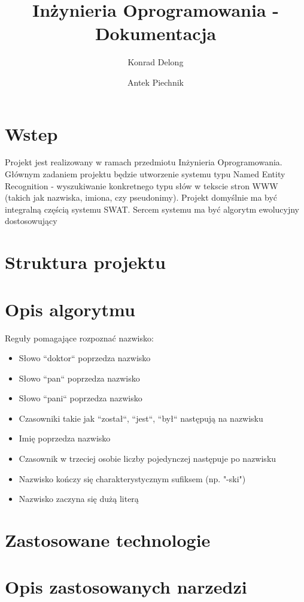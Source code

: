 \documentclass[12pt]{article}
\author{Konrad Delong \and Antek Piechnik}
\title{Inżynieria Oprogramowania - Dokumentacja}
\begin{document}
\maketitle
\tableofcontents
\newpage

\section{Wstep}
Projekt jest realizowany w ramach przedmiotu Inżynieria Oprogramowania. Głównym zadaniem projektu będzie utworzenie systemu typu Named Entity Recognition - wyszukiwanie konkretnego typu słów w tekscie stron WWW (takich jak nazwiska, imiona, czy pseudonimy). Projekt domyślnie ma być integralną częścią systemu SWAT. Sercem systemu ma być algorytm ewolucyjny dostosowujący 
\section{Struktura projektu}
\section{Opis algorytmu}
Reguły pomagające rozpoznać nazwisko:
\begin{itemize}
\item Słowo ``doktor`` poprzedza nazwisko
\item Słowo ``pan`` poprzedza nazwisko
\item Słowo ``pani`` poprzedza nazwisko
\item Czasowniki takie jak ``został``, ``jest``, ``był`` następują na nazwisku
\item Imię poprzedza nazwisko
\item Czasownik w trzeciej osobie liczby pojedynczej następuje po nazwisku
\item Nazwisko kończy się charakterystycznym sufiksem (np. "-ski")
\item Nazwisko zaczyna się dużą literą
\end{itemize}

\section{Zastosowane technologie}
\section{Opis zastosowanych narzedzi}
\end{document}
